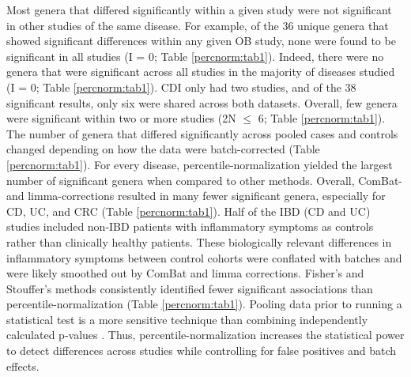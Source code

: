 Most genera that differed significantly within a given study were not significant in other studies of the same disease.
For example, of the 36 unique genera that showed significant differences within any given OB study, none were found to be significant in all studies (I = 0; Table \ref{percnorm:tab1}).
Indeed, there were no genera that were significant across all studies in the majority of diseases studied (I = 0; Table \ref{percnorm:tab1}).
CDI only had two studies, and of the 38 significant results, only six were shared across both datasets.
Overall, few genera were significant within two or more studies (2N $\leq$ 6; Table \ref{percnorm:tab1}).
The number of genera that differed significantly across pooled cases and controls changed depending on how the data were batch-corrected (Table \ref{percnorm:tab1}).
For every disease, percentile-normalization yielded the largest number of significant genera when compared to other methods.
Overall, ComBat- and limma-corrections resulted in many fewer significant genera, especially for CD, UC, and CRC (Table \ref{percnorm:tab1}).
Half of the IBD (CD and UC) studies included non-IBD patients with inflammatory symptoms as controls rather than clinically healthy patients.
These biologically relevant differences in inflammatory symptoms between control cohorts were conflated with batches and were likely smoothed out by ComBat and limma corrections.
Fisher's and Stouffer's methods consistently identified fewer significant associations than percentile-normalization (Table \ref{percnorm:tab1}).
Pooling data prior to running a statistical test is a more sensitive technique than combining independently calculated p-values \cite{46}.
Thus, percentile-normalization increases the statistical power to detect differences across studies while controlling for false positives and batch effects.

